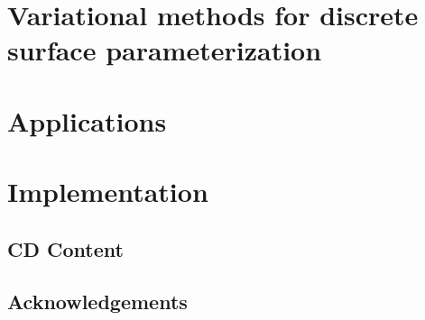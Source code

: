 \documentclass[a4paper]{book}
\def\mainbibliography {
	\backmatter
	\setcounter{secnumdepth}{-1}
	
	
}
\begin{document}
\newpage

\tableofcontents
\newpage

\newpage
\mainmatter
\setcounter{secnumdepth}{-1}

\setcounter{secnumdepth}{2}
\part{Variational methods for discrete surface parameterization}
\label{part:uniformization}

%
%
%
%
%
\setcounter{part}{1}
\part{Applications}
\label{part:applications}



\part{Implementation}
\label{part:implementation}





\newpage

\mainbibliography

\backmatter
\appendix
\chapter{CD Content}
\label{chp:cd_content}

\chapter{Acknowledgements}
\end{document}
